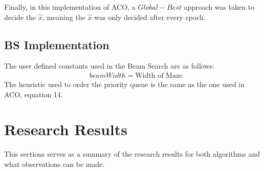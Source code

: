 \documentclass[conference]{IEEEtran}
\begin{document}
        Finally, in this implementation of ACO, a $Global-Best$ approach was taken to decide the $\hat{x}$, meaning the $\hat{x}$ was only decided after every epoch.
    \subsection{BS Implementation}
        The user defined constants used in the Beam Search are as follows:
        \begin{align}
           & beamWidth = \text{Width of Maze}
        \end{align}
        The heuristic used to order the priority queue is the same as the one used in ACO, equation 14.
\section{Research Results}
    This sections serves as a summary of the research results for both algorithms and what observations can be made.
\end{document}
